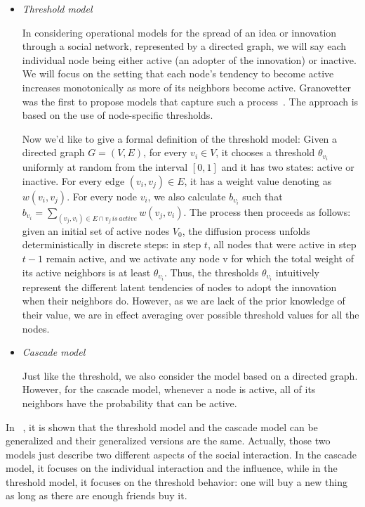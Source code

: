 \begin{itemize}

\item \textit{Threshold model}

In considering operational models for the spread of an idea or
innovation through a social network, represented by a directed
graph, we will say each individual node being either active (an
adopter of the innovation) or inactive. We will focus on the setting that
each node's tendency to become active increases monotonically as more
of its neighbors become active. Granovetter was
the first to propose models that capture such a process~\cite{granovetter1978threshold}. The
approach is based on the use of node-specific thresholds. 

Now we'd like to give a formal definition of the threshold  model: Given a directed graph $G=(V,E)$, for every $v_i \in V$, it chooses a threshold $\theta_{v_i}$ uniformly at random from the
 interval $[0,1]$ and it has two states: active or inactive. For every edge $(v_i,v_j) \in E$, it has a weight value denoting as $w(v_i,v_j)$. For every node $v_i$, we also calculate 
$b_{v_i}$ such that $b_{v_i} = \sum\limits_{(v_j,v_i)\in E \cap v_j\,is\,active}w(v_j,v_i)$.
 The process then proceeds as follows: given an initial set of
 active nodes $V_0$, the diffusion process unfolds deterministically in
 discrete steps: in step $t$, all nodes that were active in step $t-1$
 remain active, and we activate any node v for which the total weight
 of its active neighbors is at least $\theta_{v_i}$.
Thus, the thresholds $\theta_{v_i}$ intuitively represent the different
latent tendencies of nodes to adopt the innovation when their
neighbors do. However, as we are lack of the prior knowledge of their
value, we are in effect averaging over possible threshold values for
all the nodes.  

\item \textit{Cascade model}

Just like the threshold, we also consider the model based on a
directed graph. However, for the cascade model, whenever a node is
active, all of its neighbors have the probability that can be active.  

\end{itemize}

In ~\cite{kempe2003maximizing}, it is shown that the threshold model and the cascade model can be generalized and their generalized versions are the same. Actually, those two models just describe two different aspects of the social interaction. In the cascade model, it focuses on the individual interaction and the influence, while in the threshold model, it focuses on the threshold behavior: one will buy a new thing as long as there are enough friends buy it.  

